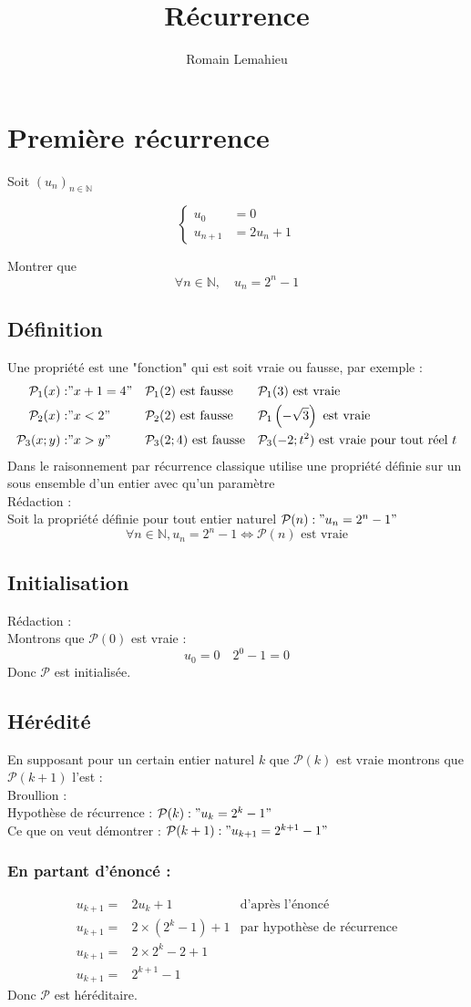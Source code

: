 \documentclass{exam}
\title{Récurrence}
\author{Romain Lemahieu}
\newcommand*{\p}{\mathcal{P}}
\newcommand*{\n}{\mathbb{N}}
\newcommand*{\sys}[1]{
  \[
\left\{
\begin{array}{lll}
  #1
\end{array}
\right .
\]
}
\begin{document}
\maketitle
\section{Première récurrence}
Soit $(u_n)_{n \in \n}$ 
\sys{
  u_0&=0\\
  u_{n+1}&=2u_n+1
}
Montrer que
$$
\forall n\in\n,
\quad
u_n=2^n-1
$$
\subsection{Définition}
Une propriété est une "fonction" qui est soit vraie ou fausse, par exemple :
\begin{align*}
\p_1(x):&"x+1=4"
&&
\p_1(2)
\text{ est fausse}
&&
\p_1(3)
\text{ est vraie}
\\
\p_2(x):&"x<2"
&&
\p_2(2)
\text{ est fausse}
&&
\p_1\left(-\sqrt{3}\right)
\text{ est vraie}
\\
\p_3(x;y):&"x>y"
&&
\p_3(2;4)
\text{ est fausse}
&&
\p_3(-2;t^2)
\text{ est vraie pour tout réel }t
\end{align*}
Dans le raisonnement par récurrence classique utilise une propriété définie
sur un sous ensemble d'un entier avec qu'un paramètre
\\
Rédaction : 
\\
Soit la propriété définie pour tout entier naturel
$\p(n):"u_n=2^n-1"$
$$
\forall n\in\n,
u_n=2^n-1
\Leftrightarrow
\p(n) \text{ est vraie}
$$
\subsection{Initialisation}
Rédaction :
\\
Montrons que $\p(0)$ est vraie :
$$
u_0=0 \quad 2^0-1=0
$$
Donc $\p$ est initialisée.
\subsection{Hérédité}
En supposant pour un certain entier naturel $k$ que $\p(k)$ est vraie
montrons que $\p(k+1)$ l'est :
\\
Broullion :
\\
Hypothèse de récurrence : $\p(k):"u_k=2^k-1"$
\\
Ce que on veut démontrer : $\p(k+1):"u_{k+1}=2^{k+1}-1"$

\subsubsection{En partant d'énoncé :}
\begin{align*}
u_{k+1}=&2u_k+1
&
\text{d'après l'énoncé}
\\
u_{k+1}=&2\times(2^k-1)+1
&
\text{par hypothèse de récurrence}
\\
u_{k+1}=&2\times2^k-2+1
\\
u_{k+1}=&2^{k+1}-1
\end{align*}
Donc $\p$ est héréditaire.
\end{document}
